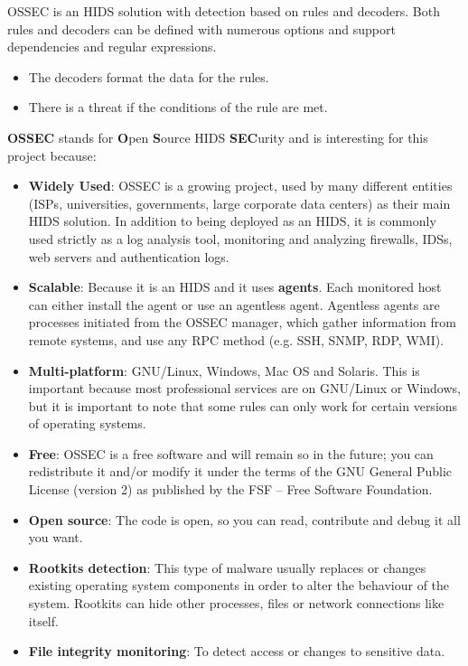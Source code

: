 \linej
\linej
OSSEC is an HIDS solution with detection based on rules and decoders. Both rules and decoders can be defined with numerous options and support dependencies and regular expressions.
\begin{itemize}
	\item The decoders format the data for the rules.
	\item There is a threat if the conditions of the rule are met.
\end{itemize}
\linej
\textbf{OSSEC} stands for \textbf{O}pen \textbf{S}ource HIDS \textbf{SEC}urity and is interesting for this project because\cite{ossec}\cite{wazuh_additional_functionality}:
\begin{itemize}
	\item \textbf{Widely Used}: OSSEC is a growing project, used by many different entities (ISPs, universities, governments, large corporate data centers) as their main HIDS solution. In addition to being deployed as an HIDS, it is commonly used strictly as a log analysis tool, monitoring and analyzing firewalls, IDSs, web servers and authentication logs.
	\item \textbf{Scalable}: Because it is an HIDS and it uses \textbf{agents}. Each monitored host can either install the agent or use an agentless agent\cite{agentless}\cite{ossec_agent}. Agentless agents are processes initiated from the OSSEC manager, which gather information from remote systems, and use any RPC method (e.g. SSH, SNMP, RDP, WMI).
	\item \textbf{Multi-platform}: GNU/Linux, Windows, Mac OS and Solaris. This is important because most professional services are on GNU/Linux or Windows, but it is important to note that some rules can only work for certain versions of operating systems.
	\item \textbf{Free}: OSSEC is a free software and will remain so in the future; you can redistribute it and/or modify it under the terms of the GNU General Public License (version 2) as published by the FSF -- Free Software Foundation.
	\item \textbf{Open source}: The code is open, so you can read, contribute and debug it all you want.
	\item \textbf{Rootkits detection}: This type of malware usually replaces or changes existing operating system components in order to alter the behaviour of the system. Rootkits can hide other processes, files or network connections like itself.
	\item \textbf{File integrity monitoring}: To detect access or changes to sensitive data.
\end{itemize}
